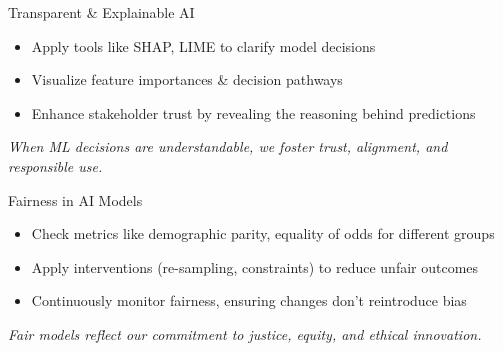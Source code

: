 \documentclass[aspectratio=169]{beamer}
\begin{document}
%
%
\begin{frame}{Transparent \& Explainable AI}
\begin{itemize}
\item Apply tools like SHAP, LIME to clarify model decisions
\item Visualize feature importances \& decision pathways
\item Enhance stakeholder trust by revealing the reasoning behind predictions
\end{itemize}

\vspace{0.8em}
\emph{When ML decisions are understandable, we foster trust, alignment, and responsible use.}

\end{frame}

%
%
\begin{frame}{Fairness in AI Models}
\begin{itemize}
\item Check metrics like demographic parity, equality of odds for different groups
\item Apply interventions (re-sampling, constraints) to reduce unfair outcomes
\item Continuously monitor fairness, ensuring changes don’t reintroduce bias
\end{itemize}

\vspace{0.8em}
\emph{Fair models reflect our commitment to justice, equity, and ethical innovation.}

\end{frame}
\end{document}

